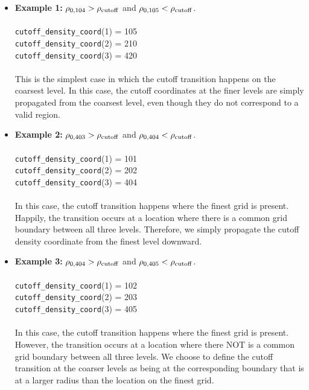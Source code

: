 \begin{itemize}

\item {\bf Example 1:} $\rho_{0,104} > \rho_{\rm cutoff}$ and $\rho_{0,105} < \rho_{\rm cutoff}$.\\ \\
{\tt cutoff\_density\_coord}(1) = 105\\
{\tt cutoff\_density\_coord}(2) = 210\\
{\tt cutoff\_density\_coord}(3) = 420\\ \\
This is the simplest case in which the cutoff transition happens on the coarsest level.
In this case, the cutoff coordinates at the finer levels are simply propagated from the
coarsest level, even though they do not correspond to a valid region.

\item {\bf Example 2:} $\rho_{0,403} > \rho_{\rm cutoff}$ and $\rho_{0,404} < \rho_{\rm cutoff}$.\\ \\
{\tt cutoff\_density\_coord}(1) = 101\\
{\tt cutoff\_density\_coord}(2) = 202\\
{\tt cutoff\_density\_coord}(3) = 404\\ \\
In this case, the cutoff transition happens where the finest grid is present.  Happily, the
transition occurs at a location where there is a common grid boundary between all three levels.
Therefore, we simply propagate the cutoff density coordinate from the finest level downward.

\item {\bf Example 3:} $\rho_{0,404} > \rho_{\rm cutoff}$ and $\rho_{0,405} < \rho_{\rm cutoff}$.\\ \\
{\tt cutoff\_density\_coord}(1) = 102\\
{\tt cutoff\_density\_coord}(2) = 203\\
{\tt cutoff\_density\_coord}(3) = 405\\ \\
In this case, the cutoff transition happens where the finest grid is present.  However, the
transition occurs at a location where there NOT is a common grid boundary between all three 
levels.  We choose to define the cutoff transition at the coarser levels as being at the
corresponding boundary that is at a larger radius than the location on the finest grid.

\end{itemize}

